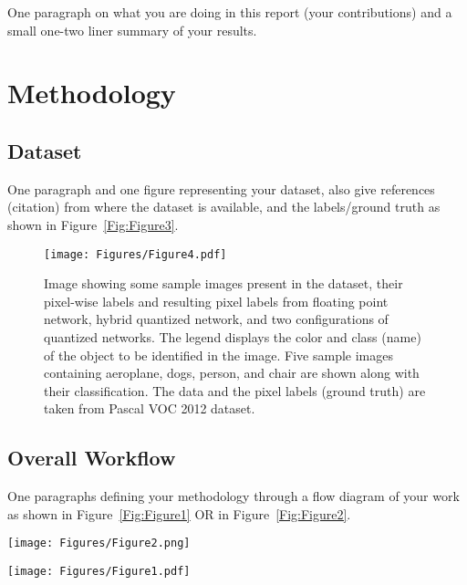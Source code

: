 \documentclass[conference]{IEEEtran}
\begin{document}
One paragraph on what you are doing in this report (your contributions) and a small one-two liner summary of your results.

\section{Methodology}
\subsection{Dataset}
One paragraph and one figure representing your dataset, also give references (citation) from where the dataset is available, and the labels/ground truth as shown in Figure~\ref{Fig:Figure3}.

\begin{figure}[!ht]
\centering
 \texttt{[image: Figures/Figure4.pdf]}
\caption{Image showing some sample images present in the dataset, their pixel-wise labels and resulting pixel labels from floating point network, hybrid quantized network, and two configurations of quantized networks. The legend displays the color and class (name) of the object to be identified in the image. Five sample images containing aeroplane, dogs, person, and chair are shown along with their classification. The data and the pixel labels (ground truth) are taken from Pascal VOC 2012 dataset.}
\label{Fig:Figure4}
\end{figure}

\subsection{Overall Workflow}
One paragraphs defining your methodology through a flow diagram of your work as shown in Figure~\ref{Fig:Figure1} OR in Figure~\ref{Fig:Figure2}.

\begin{figure*}[!ht]
\centering
\texttt{[image: Figures/Figure2.png]}
\caption{Figure showing the flowchart proposed for FCN-8 quantization and the comparison pipeline followed (for quantization techniques, i.e., Direct Quantization, Llyod's Quantizer and $L_2$ error minimization) in the current study based on pixel accuracy, mean IOU, and mean accuracy.}
\label{Fig:Figure2}
\end{figure*}


\begin{figure*}[!t]
\centering
\texttt{[image: Figures/Figure1.pdf]}
\caption{Figure showing the flowchart proposed for FCN-8 quantization and the comparison pipeline followed (for quantization technqiues, i.e., Direct Quantization, Llyod's Quantizer and $L_2$ error minimization) in the current study based on pixel accuracy, mean IOU, and mean accuracy.}
\label{Fig:Figure1}
\end{figure*}
\end{document}

